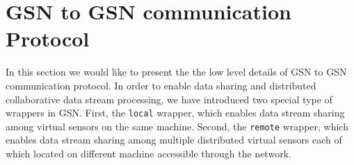 \begin{comment} %
To specify the data stream processing a suitable language is needed. A number
of proposals exist already, so we compare the language approach of GSN to the
major proposals from the literature. In the Aurora project~\cite{Cherniack03}
(\url{http://www.cs.brown.edu/research/aurora/}) users can compose stream
relationships and construct queries in a graphical representation which is then
used as input for the query planner.  The Continuous Query Language (CQL)
suggested by the STREAM project~\cite{Arasu06}
(\url{http://www-db.stanford.edu/stream/}) extends standard SQL syntax with new
constructs for temporal semantics and defines a mapping between streams and
relations. Similarly, in Cougar~\cite{Yao03}
(\url{http://www.cs.cornell.edu/database/cougar/}) an extended version of SQL
is used, modeling temporal characteristics in the language itself. The
StreaQuel language suggested by the TelegraphCQ project~\cite{Chandrasekaran03}
(\url{http://telegraph.cs.berkeley.edu/}) follows a different path and tries to
isolate temporal semantics from the query language through external definitions
in a C-like syntax. For example, for specifying a sliding window for a query a
\textit{for}-loop is used. The actual query is then formulated in an SQL-like
syntax.

GSN's approach is related to TelegraphCQ's as it separates the
time-related constructs from the actual query. Temporal
specifications, e.g., the window size and rates, are specified in XML in the
virtual sensor specification, while data processing is specified in
SQL. Using this design, GSN can support SQL queries with the full range of
operations allowed by the standard SQL syntax \footnote{As of \today, GSN does not support the following standard SQL keywords: Group-By, Limit, Top and Offset.}

, i.e., joins,
sub-queries, ordering, grouping, unions, intersections, etc.
The advantage of using SQL is that it is well-known and SQL query
optimization and planning techniques can be directly applied.
\end{comment}

\section{GSN to GSN communication Protocol}
In this section we would like to present the the low level details of GSN to GSN communication protocol.
In order to enable data sharing and distributed collaborative data stream processing, we have introduced
two special type of wrappers in GSN. First, the \texttt{local} wrapper, which enables data stream sharing
among virtual sensors on the same machine. Second, the \texttt{remote} wrapper, which enables data stream
sharing among multiple distributed virtual sensors each of which located on different machine accessible through the network.

